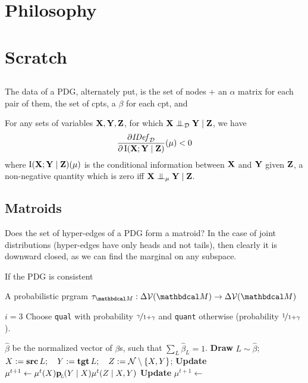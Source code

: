 \documentclass[the-pdg-manual.tex]{subfiles}
\begin{document}
\section{Philosophy}

\section{Scratch}
\begin{inactive}
	\subsection{}
	The data of a PDG, alternately put, is the set of nodes + an $\alpha$ matrix for each pair of them, the set of cpts, a $\beta$ for each cpt, and

	\begin{prop}
		For any sets of variables $\mathbf X, \mathbf Y, \mathbf Z$, for which $\mathbf X \mathrel{\perp\mspace{-10mu}\perp}_{\mathcal D} \mathbf Y \mid \mathbf Z$, we have
		\[ \frac{\partial \mathit{IDef}_{\cal D}}{\partial \operatorname{\mathrm{I}}(\mathbf X; \mathbf Y \mid \mathbf Z)}(\mu) < 0 \]
		where $\operatorname{\mathrm{I}}(\mathbf X; \mathbf Y \mid \mathbf Z)(\mu)$ is the conditional information between $\mathbf X$ and $\mathbf Y$ given $\mathbf Z$, a non-negative quantity which is zero iff $\mathbf X \mathrel{\perp\mspace{-10mu}\perp}_{\mu} \mathbf Y \mid \mathbf Z$.
	\end{prop}
\end{inactive}

\begin{annotating}[frametitle={Matroids}]
	\subsection{Matroids}
	Does the set of hyper-edges of a PDG form a matroid?
	In the case of joint distributions (hyper-edges have only heads and not tails), then clearly it
	is downward closed, as we can find the marginal on any subspace.


	If the PDG is consistent
\end{annotating}



A probabilistic prgram $\tau_{\dg M} : \Delta\V(\dg M) \to \Delta \V(\dg M)$
\begin{algorithmic}
	\State $i = 3$
		\State Choose \texttt{qual} with probability $\nicefrac{\gamma}{1+\gamma}$ and \texttt{quant} otherwise (probability $\nicefrac1{1+\gamma}$).

			 $\hat \beta$ be the normalized vector of $\beta$s, such that $\sum_L\hat\beta_L = 1$.
			\State \textbf{Draw}  $L \sim \hat\beta$;
			 $X:= \operatorname{\mathbf{src}} L;\quad Y := \operatorname{\mathbf{tgt}} L;\quad Z:= \mathcal N \setminus\{X,Y\}$;
			\State \textbf{Update} $\mu^{t+1} \gets \mu^t(X) \mathbf{p}_{\!_{L}\!}(Y \mid X) \mu^t(Z \mid X,Y)$
			\State \textbf{Update} $\mu^{t+1} \gets $
		\EndIf

	\EndFor
\end{algorithmic}
\end{document}
